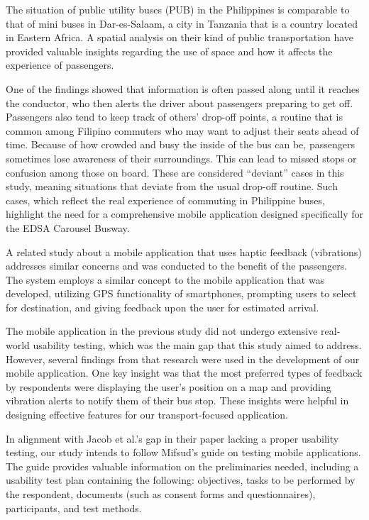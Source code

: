 \documentclass{icsthesis}
\begin{document}
\begin{mainmatter}
The situation of public utility buses (PUB) in the Philippines is comparable to that of mini buses in Dar-es-Salaam, a city in Tanzania that is a country located in Eastern Africa. A spatial analysis \citep{Ref:005} on their kind of public transportation have provided valuable insights regarding the use of space and how it affects the experience of passengers.

One of the findings showed that information is often passed along until it reaches the conductor, who then alerts the driver about passengers preparing to get off. Passengers also tend to keep track of others' drop-off points, a routine that is common among Filipino commuters who may want to adjust their seats ahead of time. Because of how crowded and busy the inside of the bus can be, passengers sometimes lose awareness of their surroundings. This can lead to missed stops or confusion among those on board. These are considered “deviant” cases in this study, meaning situations that deviate from the usual drop-off routine. Such cases, which reflect the real experience of commuting in Philippine buses, highlight the need for a comprehensive mobile application designed specifically for the EDSA Carousel Busway.

A related study about a mobile application that uses haptic feedback (vibrations) \citep{Ref:009} addresses similar concerns and was conducted to the benefit of the passengers. The system employs a similar concept to the mobile application that was developed, utilizing GPS functionality of smartphones, prompting users to select for destination, and giving feedback upon the user for estimated arrival.

The mobile application in the previous study did not undergo extensive real-world usability testing, which was the main gap that this study aimed to address. However, several findings from that research were used in the development of our mobile application. One key insight was that the most preferred types of feedback by respondents were displaying the user’s position on a map and providing vibration alerts to notify them of their bus stop. These insights were helpful in designing effective features for our transport-focused application.

In alignment with Jacob et al.’s gap in their paper lacking a proper usability testing, our study intends to follow Mifsud’s guide \citep{Ref:013} on testing mobile applications. The guide provides valuable information on the preliminaries needed, including a usability test plan containing the following: objectives, tasks to be performed by the respondent, documents (such as consent forms and questionnaires), participants, and test methods.


\end{mainmatter}
\end{document}
